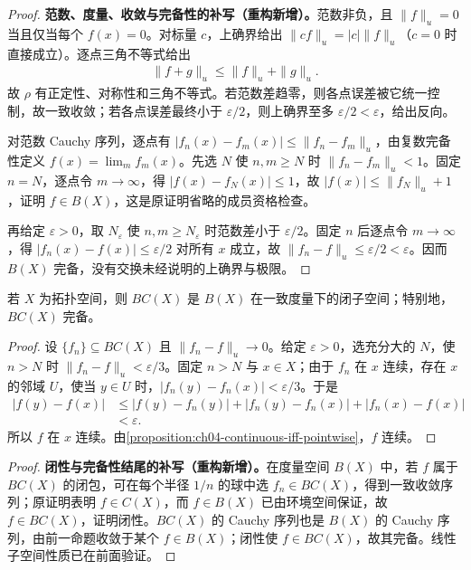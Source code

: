 \documentclass[../../main.tex]{subfiles}%
\begin{document}
\begin{proof}
\textbf{范数、度量、收敛与完备性的补写（重构新增）。}范数非负，且 $\|f\|_u=0$ 当且仅当每个 $f(x)=0$。对标量 $c$，上确界给出 $\|cf\|_u=|c|\|f\|_u$（$c=0$ 时直接成立）。逐点三角不等式给出
\begin{align*}
\|f+g\|_u\le\|f\|_u+\|g\|_u.
\end{align*}
故 $\rho$ 有正定性、对称性和三角不等式。若范数差趋零，则各点误差被它统一控制，故一致收敛；若各点误差最终小于 $\varepsilon/2$，则上确界至多 $\varepsilon/2<\varepsilon$，给出反向。

对范数 Cauchy 序列，逐点有 $|f_n(x)-f_m(x)|\le\|f_n-f_m\|_u$，由复数完备性定义 $f(x)=\lim_mf_m(x)$。先选 $N$ 使 $n,m\ge N$ 时 $\|f_n-f_m\|_u<1$。固定 $n=N$，逐点令 $m\to\infty$，得 $|f(x)-f_N(x)|\le1$，故 $|f(x)|\le\|f_N\|_u+1$，证明 $f\in B(X)$，这是原证明省略的成员资格检查。

再给定 $\varepsilon>0$，取 $N_\varepsilon$ 使 $n,m\ge N_\varepsilon$ 时范数差小于 $\varepsilon/2$。固定 $n$ 后逐点令 $m\to\infty$，得 $|f_n(x)-f(x)|\le\varepsilon/2$ 对所有 $x$ 成立，故 $\|f_n-f\|_u\le\varepsilon/2<\varepsilon$。因而 $B(X)$ 完备，没有交换未经说明的上确界与极限。
\end{proof}
\begin{proposition}\label{proposition:ch04-bc-closed-complete}
若 $X$ 为拓扑空间，则 $BC(X)$ 是 $B(X)$ 在一致度量下的闭子空间；特别地，$BC(X)$ 完备。
\end{proposition}
\begin{proof}
设 $\{f_n\}\subseteq BC(X)$ 且 $\|f_n-f\|_u\to0$。给定 $\varepsilon>0$，选充分大的 $N$，使 $n>N$ 时 $\|f_n-f\|_u<\varepsilon/3$。固定 $n>N$ 与 $x\in X$；由于 $f_n$ 在 $x$ 连续，存在 $x$ 的邻域 $U$，使当 $y\in U$ 时，$|f_n(y)-f_n(x)|<\varepsilon/3$。于是
\begin{align*}
|f(y)-f(x)|
&\le|f(y)-f_n(y)|+|f_n(y)-f_n(x)|+|f_n(x)-f(x)|\\
&<\varepsilon.
\end{align*}
所以 $f$ 在 $x$ 连续。由\cref{proposition:ch04-continuous-iff-pointwise}，$f$ 连续。
\end{proof}
\begin{proof}
\textbf{闭性与完备性结尾的补写（重构新增）。}在度量空间 $B(X)$ 中，若 $f$ 属于 $BC(X)$ 的闭包，可在每个半径 $1/n$ 的球中选 $f_n\in BC(X)$，得到一致收敛序列；原证明表明 $f\in C(X)$，而 $f\in B(X)$ 已由环境空间保证，故 $f\in BC(X)$，证明闭性。$BC(X)$ 的 Cauchy 序列也是 $B(X)$ 的 Cauchy 序列，由前一命题收敛于某个 $f\in B(X)$；闭性使 $f\in BC(X)$，故其完备。线性子空间性质已在前面验证。
\end{proof}
\end{document}
